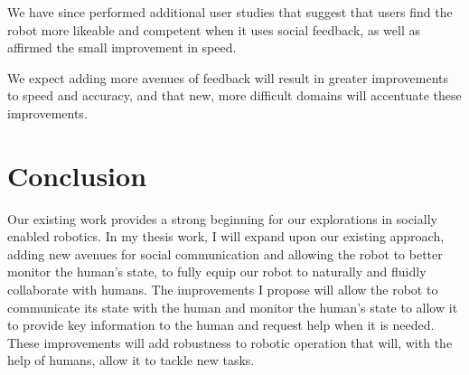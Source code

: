 \documentclass{article}
\begin{document}
We have since performed additional user studies that suggest that users find the robot more likeable and competent when it uses social feedback, as well as affirmed the small improvement in speed. 

We expect adding more avenues of feedback will result in greater improvements to speed and accuracy, and that new, more difficult domains will accentuate these improvements. 

\section{Conclusion}

Our existing work provides a strong beginning for our explorations in socially enabled robotics. In my thesis work, I will expand upon our existing approach, adding new avenues for social communication and allowing the robot to better monitor the human's state, to fully equip our robot to naturally and fluidly collaborate with humans. The improvements I propose will allow the robot to communicate its state with the human and monitor the human's state to allow it to provide key information to the human and request help when it is needed. These improvements will add robustness to robotic operation that will, with the help of humans, allow it to tackle new tasks. 
\end{document}
